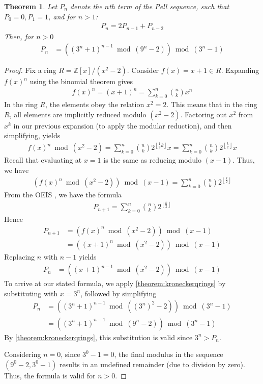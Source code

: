 \documentclass[11pt,reqno]{article}
\theoremstyle{plain}
\newtheorem{theorem}{Theorem}
\theoremstyle{definition}
\newcommand{\floor}[1]{\left\lfloor #1 \right\rfloor}
\begin{document}
\begin{theorem} \label{theorem:pell}
Let $P_n$ denote the $n$th term of the Pell sequence, such that $P_0 = 0, P_1 = 1$, and for $n > 1$:
\begin{align*}
    P_n = 2 P_{n-1} + P_{n-2}
\end{align*}
Then, for $n > 0$
\begin{align*}
P_n &= \left((3^n+1)^{n-1} \bmod{(9^n-2)}\right) \bmod{(3^n-1)} 
\end{align*}
\end{theorem}
\begin{proof}
Fix a ring $R = \mathbb{Z}[x]/(x^2 - 2)$. Consider $f(x) = x+1 \in R$. Expanding $f(x)^n$ using the binomial theorem gives
\begin{align*}
    f(x)^n = (x+1)^n = \sum_{k=0}^{n} \binom{n}{k} x^n
\end{align*}
In the ring $R$, the elements obey the relation $x^2 = 2$. This means that in the ring $R$, all elements are implicitly reduced modulo $(x^2 - 2)$. Factoring out $x^2$ from $x^k$ in our previous expansion (to apply the modular reduction), and then simplifying, yields
\begin{align*}
    f(x)^n \bmod{(x^2 - 2)} = \sum_{k=0}^{n} \binom{n}{k} 2^{\floor{\frac{1}{2} k}} x
    = \sum_{k=0}^{n} \binom{n}{k} 2^{\floor{\frac{k}{2}}} x
\end{align*}
Recall that evaluating at $x=1$ is the same as reducing modulo $(x-1)$. Thus, we have
\begin{align*}
    \left(f(x)^n \bmod{(x^2-2)}\right) \bmod{(x-1)} = \sum_{k=0}^{n} \binom{n}{k} 2^{\floor{\frac{k}{2}}}
\end{align*}
From the OEIS \cite{A000129}, we have the formula
\begin{align*}
    P_{n+1} = \sum_{k=0}^{n} \binom{n}{k} 2^{\floor{\frac{k}{2}}}
\end{align*}
Hence
\begin{align*}
    P_{n+1} &= \left( f(x)^n \bmod{(x^2-2)} \right) \bmod{(x-1)} \\
    &= \left( (x+1)^n \bmod{(x^2-2)} \right) \bmod{(x-1)}
\end{align*}
Replacing $n$ with $n-1$ yields
\begin{align*}
    P_n &= \left((x+1)^{n-1} \bmod{(x^2-2)}\right) \bmod{(x-1)}
\end{align*}
To arrive at our stated formula, we apply \cref{theorem:kroneckerqrings} by substituting with $x = 3^n$, followed by simplifying
\begin{align*}
     P_n &= \left((3^n+1)^{n-1} \bmod{((3^n)^2-2)}\right) \bmod{(3^n-1)} \\
     &= \left((3^n+1)^{n-1} \bmod{(9^n-2)}\right) \bmod{(3^n-1)} 
\end{align*}
By \cref{theorem:kroneckerqrings}, this substitution is valid since $3^n > P_n$.

Considering $n = 0$, since $3^0-1 = 0$, the final modulus in the sequence $(9^0-2, 3^0-1)$ results in an undefined remainder (due to division by zero). Thus, the formula is valid for $n > 0$.
\end{proof}
\end{document}
